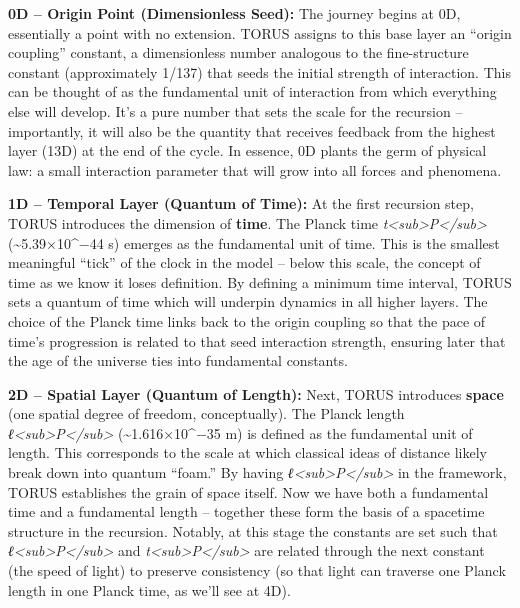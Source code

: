 \documentclass[
]{article}
\begin{document}
\textbf{0D -- Origin Point (Dimensionless Seed):} The journey begins at
0D, essentially a point with no extension. TORUS assigns to this base
layer an ``origin coupling'' constant, a dimensionless number analogous
to the fine-structure constant (approximately 1/137) that seeds the
initial strength of interaction. This can be thought of as the
fundamental unit of interaction from which everything else will develop.
It's a pure number that sets the scale for the recursion -- importantly,
it will also be the quantity that receives feedback from the highest
layer (13D) at the end of the cycle. In essence, 0D plants the germ of
physical law: a small interaction parameter that will grow into all
forces and phenomena.

\textbf{1D -- Temporal Layer (Quantum of Time):} At the first recursion
step, TORUS introduces the dimension of \textbf{time}. The Planck time
\emph{t\textless sub\textgreater P\textless/sub\textgreater{}}
(\textasciitilde5.39×10\^{}−44 s) emerges as the fundamental unit of
time. This is the smallest meaningful ``tick'' of the clock in the model
-- below this scale, the concept of time as we know it loses definition.
By defining a minimum time interval, TORUS sets a quantum of time which
will underpin dynamics in all higher layers. The choice of the Planck
time links back to the origin coupling so that the pace of time's
progression is related to that seed interaction strength, ensuring later
that the age of the universe ties into fundamental constants.

\textbf{2D -- Spatial Layer (Quantum of Length):} Next, TORUS introduces
\textbf{space} (one spatial degree of freedom, conceptually). The Planck
length \emph{ℓ\textless sub\textgreater P\textless/sub\textgreater{}}
(\textasciitilde1.616×10\^{}−35 m) is defined as the fundamental unit of
length. This corresponds to the scale at which classical ideas of
distance likely break down into quantum ``foam.'' By having
\emph{ℓ\textless sub\textgreater P\textless/sub\textgreater{}} in the
framework, TORUS establishes the grain of space itself. Now we have both
a fundamental time and a fundamental length -- together these form the
basis of a spacetime structure in the recursion. Notably, at this stage
the constants are set such that
\emph{ℓ\textless sub\textgreater P\textless/sub\textgreater{}} and
\emph{t\textless sub\textgreater P\textless/sub\textgreater{}} are
related through the next constant (the speed of light) to preserve
consistency (so that light can traverse one Planck length in one Planck
time, as we'll see at 4D).
\end{document}
